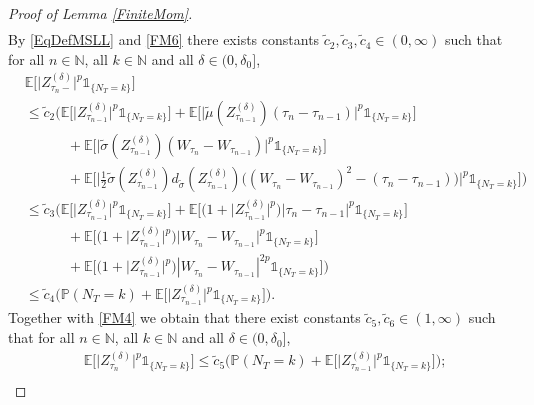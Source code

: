 \documentclass[11pt,a4paper]{article}
\numberwithin{equation}{section}
\theoremstyle{definition}
\newcommand{\E}{{\mathbb{E}}}
\newcommand{\N}{{\mathbb{N}}}
\renewcommand{\P}{{\mathbb{P}}}
\begin{document}
\begin{proof}[Proof of Lemma \ref{FiniteMom}]
\begin{equation}
\begin{aligned}
    \end{aligned}
\end{equation}
By \eqref{EqDefMSLL} and \eqref{FM6} there exists constants $\widetilde c_2, \widetilde c_3, \widetilde c_4 \in(0,\infty)$ such that for all $n\in\N$, all $k\in\N$ and all $\delta \in (0,\delta_0]$,
\begin{equation}
    \begin{aligned}\label{FM5}
    &\E\Big[\big|Z^{(\delta)}_{\tau_{n}-}\big|^p\mathds{1}_{\{N_T = k\}} \Big]\\
    &\leq \widetilde c_2 \Big(  \E\Big[\big|Z^{(\delta)}_{\tau_{n-1}}\big|^p\mathds{1}_{\{N_T = k\}} \Big] + \E\Big[\big|\widetilde\mu(Z^{(\delta)}_{\tau_{n-1}}) (\tau_n- \tau_{n-1})\big|^p\mathds{1}_{\{N_T =k\}} \Big] \\
    &\quad\quad\quad +\E\Big[\big|\widetilde\sigma(Z^{(\delta)}_{\tau_{n-1}}) (W_{\tau_n} - W_{\tau_{n-1}})\big|^p\mathds{1}_{\{N_T = k\}} \Big]\\ 
    &\quad\quad\quad +\E\Big[\Big| \frac{1}{2} \widetilde\sigma(Z^{(\delta)}_{\tau_{n-1}}) d_{\widetilde\sigma} (Z^{(\delta)}_{\tau_{n-1}}) \big((W_{\tau_n} - W_{\tau_{n-1}})^2 - (\tau_n- \tau_{n-1})\big)\Big|^p\mathds{1}_{\{N_T = k\}} \Big]\Big)\\
    &\leq \widetilde c_3 \Big(  \E\Big[\big|Z^{(\delta)}_{\tau_{n-1}}\big|^p\mathds{1}_{\{N_T =k\}} \Big] + \E\Big[\big( 1+ \big|Z^{(\delta)}_{\tau_{n-1}}\big|^p\big) \big|\tau_n- \tau_{n-1}\big|^p\mathds{1}_{\{N_T =k\}}\Big] \\
    &\quad\quad\quad + \E\Big[ \big( 1+ \big|Z^{(\delta)}_{\tau_{n-1}}\big|^p\big)
    \big|W_{\tau_n} - W_{\tau_{n-1}}\big|^p\mathds{1}_{\{N_T =k\}} \Big]\\ 
    &\quad\quad\quad + \E\Big[ \big( 1+ \big|Z^{(\delta)}_{\tau_{n-1}}\big|^p\big) |W_{\tau_n} - W_{\tau_{n-1}}|^{2p} \mathds{1}_{\{N_T =k\}}\Big]\Big)\\
    &\leq \widetilde c_4 \Big( \P(N_T =k) + \E\Big[\big|Z^{(\delta)}_{\tau_{n-1}}\big|^p\mathds{1}_{\{N_T =k\}}\Big]\Big).
    \end{aligned}
\end{equation}
Together with \eqref{FM4} we obtain that there exist constants $\widetilde c_5,\widetilde c_6 \in(1,\infty)$ such that for all $n\in\N$, all $k\in\N$ and all $\delta \in (0,\delta_0]$,
\begin{align}
    &\E\Big[\big|Z^{(\delta)}_{\tau_{n}}\big|^p\mathds{1}_{\{N_T =k\}}\Big]
    \leq \widetilde c_5\Big(\P(N_T =k)+ \E\Big[\big|Z^{(\delta)}_{\tau_{n-1}}\big|^p\mathds{1}_{\{N_T =k\}}\Big]\Big); \label{FM7}\\

\end{align}
\end{proof}
\end{document}
